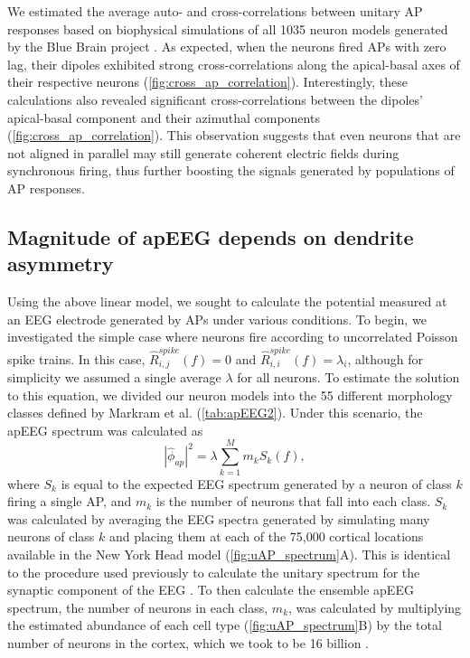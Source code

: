 We estimated the average auto- and cross-correlations between unitary AP responses based on biophysical simulations of all 1035 neuron models generated by the Blue Brain project \cite{Markram2015}. As expected, when the neurons fired APs with zero lag, their dipoles exhibited strong cross-correlations along the apical-basal axes of their respective neurons ({\autoref{fig:cross_ap_correlation}}). Interestingly, these calculations also revealed significant cross-correlations between the dipoles' apical-basal component and their azimuthal components ({\autoref{fig:cross_ap_correlation}}). This observation suggests that even neurons that are not aligned in parallel may still generate coherent electric fields during synchronous firing, thus further boosting the signals generated by populations of AP responses.

\subsection{Magnitude of apEEG depends on dendrite asymmetry}
Using the above linear model, we sought to calculate the potential measured at an EEG electrode generated by APs under various conditions. To begin, we investigated the simple case where neurons fire according to uncorrelated Poisson spike trains. In this case, $\hat{R}_{i,j}^{spike}(f)=0$ and $\hat{R}_{i,i}^{spike}(f)=\lambda_i$, although for simplicity we assumed a single average $\lambda$ for all neurons. To estimate the solution to this equation, we divided our neuron models into the 55 different morphology classes defined by Markram et al. \cite{Markram2015} (\autoref{tab:apEEG2}). Under this scenario, the apEEG spectrum was calculated as
\begin{equation} \label{eq:apEEG_spectrum_linear}
    |\hat{\phi}_{ap}|^2 = \lambda \sum_{k=1}^M m_k S_k(f)\mathrm{,}
\end{equation}
where $S_k$ is equal to the expected EEG spectrum generated by a neuron of class $k$ firing a single AP, and $m_k$ is the number of neurons that fall into each class. $S_k$ was calculated by averaging the EEG spectra generated by simulating many neurons of class $k$ and placing them at each of the 75,000 cortical locations available in the New York Head model \cite{Huang2016} ({\autoref{fig:uAP_spectrum}A}). This is identical to the procedure used previously to calculate the unitary spectrum for the synaptic component of the EEG \cite{Brake2024}. To then calculate the ensemble apEEG spectrum, the number of neurons in each class, $m_k$, was calculated by multiplying the estimated abundance of each cell type \cite{Markram2015} ({\autoref{fig:uAP_spectrum}B}) by the total number of neurons in the cortex, which we took to be 16 billion \cite{Azevedo2009}.

